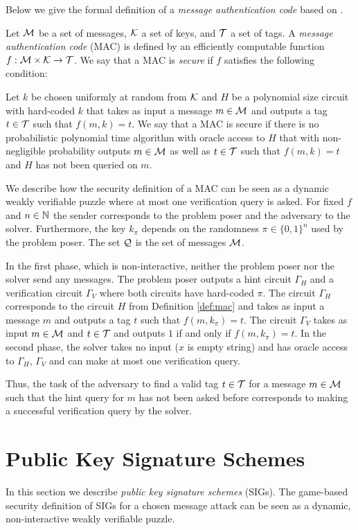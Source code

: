 Below we give the formal definition of a \textit{message authentication code} based on \cite{LectureNotesCrypo, Goldreich:2004:FCV:975541}.
%
\begin{definition}
  \label{def:mac}
  Let $\mathcal{M}$ be a set of messages, $\mathcal{K}$ a set of keys, and $\mathcal{T}$ a set of tags.
  A \textit{message authentication code} (MAC) is defined by an efficiently computable function $f:\mathcal{M} \times \mathcal{K} \rightarrow \mathcal{T}$.
  We say that a MAC is \textit{secure} if $f$ satisfies the following condition:

  Let $k$ be chosen uniformly at random from $\mathcal{K}$ and $H$ be a polynomial size circuit with hard-coded $k$
  that takes as input a message $m \in \mathcal{M}$ and outputs a tag $t \in \mathcal{T}$ such that $f(m,k) = t$.
  We say that a MAC is secure if there is no probabilistic polynomial time algorithm
  with oracle access to $H$ that with non-negligible probability outputs $m \in \mathcal{M}$
  as well as $t \in \mathcal{T}$ such that $f(m, k) = t$ and $H$ has not been queried on $m$.
\end{definition}

We describe how the security definition of a MAC can be seen as a dynamic weakly verifiable puzzle
where at most one verification query is asked.
For fixed $f$ and $n \in \mathbb{N}$ the sender corresponds to the problem poser and the adversary to the solver.
Furthermore, the key $k_{\pi}$ depends on the randomness $\pi \in \{0,1\}^{n}$ used by the problem poser.
The set $\mathcal{Q}$ is the set of messages $\mathcal{M}$.

In the first phase, which is non-interactive, neither the problem poser nor the solver send any messages.
The problem poser outputs a hint circuit $\Gamma_H$ and a verification circuit $\Gamma_V$ where both circuits
have hard-coded $\pi$.
The circuit $\Gamma_H$ corresponds to the circuit $H$ from Definition \ref{def:mac} and takes as input
a message $m$ and outputs a tag $t$ such that $f(m, k_{\pi}) = t$.
The circuit $\Gamma_V$ takes as input $m \in \mathcal{M}$ and $t \in \mathcal{T}$ and outputs $1$ if and only if $f(m, k_{\pi}) = t$.
In the second phase, the solver takes no input ($x$ is empty string) and has oracle access to $\Gamma_H$, $\Gamma_V$ and
can make at most one verification query.

Thus, the task of the adversary to find a valid tag $t \in \mathcal{T}$ for a message $m \in \mathcal{M}$ such that the hint query for $m$
has not been asked before corresponds to making a successful verification query by the solver.
%
\section{Public Key Signature Schemes}
\label{section:pks}
In this section we describe \textit{public key signature schemes} (SIGs).
The game-based security definition of SIGs for a chosen message attack can be seen as a dynamic,
non-interactive weakly verifiable puzzle.


